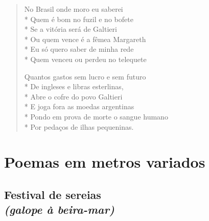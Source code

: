 \begin{verse}
No Brasil onde moro eu saberei\\*
Quem é bom no fuzil e no bofete\\*
Se a vitória será de Galtieri\\*
Ou quem vence é a fêmea Margareth\\*
Eu só quero saber de minha rede\\*
Quem venceu ou perdeu no telequete

Quantos gastos sem lucro e sem futuro\\*
De ingleses e libras esterlinas,\\*
Abre o cofre do povo Galtieri\\*
E joga fora as moedas argentinas\\*
Pondo em prova de morte o sangue humano\\*
Por pedaços de ilhas pequeninas.
\end{verse}


\cleardoublepage

\part*{Poemas em metros variados}

\chapter[Festival de sereias]{Festival de sereias\\\smallskip\textit{(galope à beira-mar)}}

